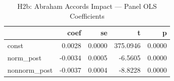 \begin{table}
\caption{H2b: Abraham Accords Impact — Panel OLS Coefficients}
\label{tab:h2b_regression}
\begin{tabular}{lrrrr}
\toprule
 & coef & se & t & p \\
\midrule
const & 0.0028 & 0.0000 & 375.0946 & 0.0000 \\
norm\_post & -0.0034 & 0.0005 & -6.5605 & 0.0000 \\
nonnorm\_post & -0.0037 & 0.0004 & -8.8228 & 0.0000 \\
\bottomrule
\end{tabular}
\end{table}
